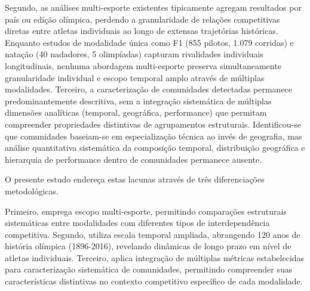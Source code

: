 Segundo, as análises multi-esporte existentes tipicamente agregam resultados por país ou edição olímpica, perdendo a granularidade de relações competitivas diretas entre atletas individuais ao longo de extensas trajetórias históricas. Enquanto estudos de modalidade única como F1 (855 pilotos, 1.079 corridas) e natação (40 nadadores, 5 olimpíadas) capturam rivalidades individuais longitudinais, nenhuma abordagem multi-esporte preserva simultaneamente granularidade individual e escopo temporal amplo através de múltiplas modalidades. Terceiro, a caracterização de comunidades detectadas permanece predominantemente descritiva, sem a integração sistemática de múltiplas dimensões analíticas (temporal, geográfica, performance) que permitam compreender propriedades distintivas de agrupamentos estruturais. Identificou-se que comunidades baseiam-se em especialização técnica ao invés de geografia, mas análise quantitativa sistemática da composição temporal, distribuição geográfica e hierarquia de performance dentro de comunidades permanece ausente.

O presente estudo endereça estas lacunas através de três diferenciações metodológicas.

Primeiro, emprega escopo multi-esporte, permitindo comparações estruturais sistemáticas entre modalidades com diferentes tipos de interdependência competitiva. Segundo, utiliza escala temporal ampliada, abrangendo 120 anos de história olímpica (1896-2016), revelando dinâmicas de longo prazo em nível de atletas individuais. Terceiro, aplica integração de múltiplas métricas estabelecidas para caracterização sistemática de comunidades, permitindo compreender suas características distintivas no contexto competitivo específico de cada modalidade.